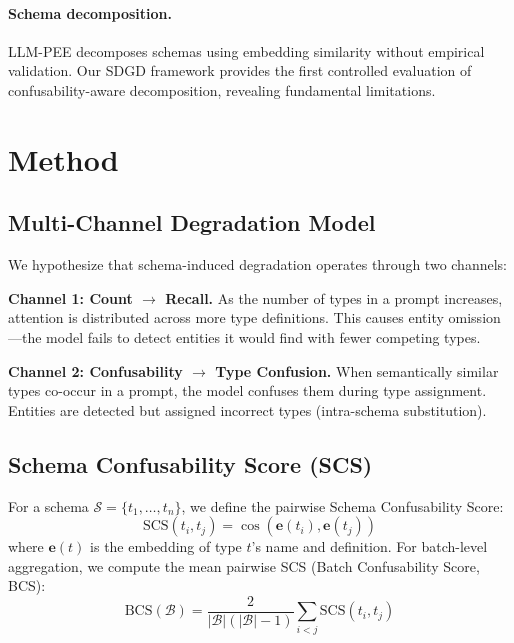 \documentclass[11pt,a4paper]{article}
\begin{document}
\paragraph{Schema decomposition.} LLM-PEE decomposes schemas using embedding similarity without empirical validation. Our SDGD framework provides the first controlled evaluation of confusability-aware decomposition, revealing fundamental limitations.

\section{Method}

\subsection{Multi-Channel Degradation Model}

We hypothesize that schema-induced degradation operates through two channels:

\noindent\textbf{Channel 1: Count $\rightarrow$ Recall.} As the number of types in a prompt increases, attention is distributed across more type definitions. This causes entity omission---the model fails to detect entities it would find with fewer competing types.

\noindent\textbf{Channel 2: Confusability $\rightarrow$ Type Confusion.} When semantically similar types co-occur in a prompt, the model confuses them during type assignment. Entities are detected but assigned incorrect types (intra-schema substitution).

\subsection{Schema Confusability Score (SCS)}
\label{sec:scs_method}

For a schema $\mathcal{S} = \{t_1, \ldots, t_n\}$, we define the pairwise Schema Confusability Score:
\begin{equation}
\text{SCS}(t_i, t_j) = \cos(\mathbf{e}(t_i), \mathbf{e}(t_j))
\end{equation}
where $\mathbf{e}(t)$ is the embedding of type $t$'s name and definition. For batch-level aggregation, we compute the mean pairwise SCS (Batch Confusability Score, BCS):
\begin{equation}
\text{BCS}(\mathcal{B}) = \frac{2}{|\mathcal{B}|(|\mathcal{B}|-1)} \sum_{i<j} \text{SCS}(t_i, t_j)
\end{equation}
\end{document}
